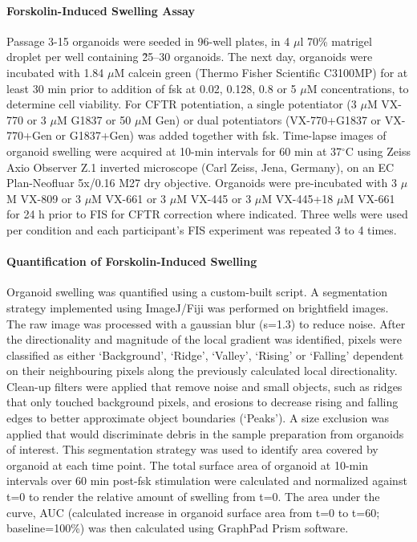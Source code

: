 \paragraph{Forskolin-Induced Swelling Assay} Passage 3-15 organoids were seeded in 96-well plates, in 4 $\mu$l 70\% matrigel droplet per well containing \~25–30 organoids. The next day, organoids were incubated with 1.84 $\mu$M calcein green (Thermo Fisher Scientific C3100MP) for at least 30 min prior to addition of fsk at 0.02, 0.128, 0.8 or 5 $\mu$M concentrations, to determine cell viability. For CFTR potentiation, a single potentiator (3 $\mu$M VX-770 or 3 $\mu$M G1837 or 50 $\mu$M Gen) or dual potentiators (VX-770+G1837 or VX-770+Gen or G1837+Gen) was added together with fsk. Time-lapse images of organoid swelling were acquired at 10-min intervals for 60 min at 37$^\circ$C using Zeiss Axio Observer Z.1 inverted microscope (Carl Zeiss, Jena, Germany), on an EC Plan-Neofluar 5x/0.16 M27 dry objective. Organoids were pre-incubated with 3 $\mu$M VX-809 or 3 $\mu$M VX-661 or 3 $\mu$M VX-445 or 3 $\mu$M VX-445+18 $\mu$M VX-661 for 24 h prior to FIS for CFTR correction where indicated. Three wells were used per condition and each participant’s FIS experiment was repeated 3 to 4 times.

\paragraph{Quantification of Forskolin-Induced Swelling} Organoid swelling was quantified using a custom-built script. A segmentation strategy implemented using ImageJ/Fiji was performed on brightfield images. The raw image was processed with a gaussian blur (s=1.3) to reduce noise. After the directionality and magnitude of the local gradient was identified, pixels were classified as either ‘Background’, ‘Ridge’, ‘Valley’, ‘Rising’ or ‘Falling’ dependent on their neighbouring pixels along the previously calculated local directionality. Clean-up filters were applied that remove noise and small objects, such as ridges that only touched background pixels, and erosions to decrease rising and falling edges to better approximate object boundaries (‘Peaks’). A size exclusion was applied that would discriminate debris in the sample preparation from organoids of interest. This segmentation strategy was used to identify area covered by organoid at each time point. The total surface area of organoid at 10-min intervals over 60 min post-fsk stimulation were calculated and normalized against t=0 to render the relative amount of swelling from t=0. The area under the curve, AUC (calculated increase in organoid surface area from t=0 to t=60; baseline=100\%) was then calculated using GraphPad Prism software.

